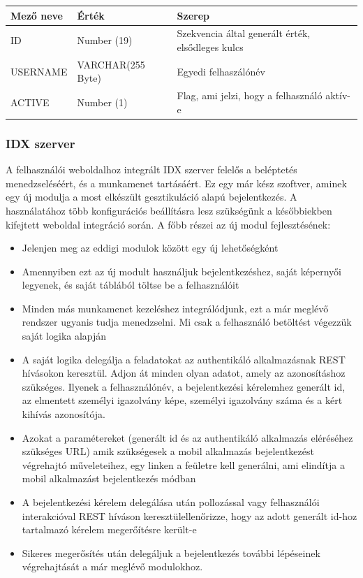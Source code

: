 	\begin{tabular}{|p{4cm}|p{3cm} |p{4cm}|}
   	\hline
	\textbf{Mező neve} & \textbf{Érték} & \textbf{Szerep}\\ \hline
	ID & Number (19) & Szekvencia által generált érték, elsődleges kulcs \\ \hline
	USERNAME & VARCHAR(255 Byte) & Egyedi felhaszálónév  \\ \hline
	ACTIVE & Number (1) & Flag, ami jelzi, hogy a felhasználó aktív-e \\ \hline
	\end{tabular}

\subsubsection{IDX szerver}
A felhasználói weboldalhoz integrált IDX szerver felelős a beléptetés menedzseléséért, és a munkamenet tartásáért. Ez egy már kész szoftver, aminek egy új modulja a most elkészült gesztikuláció alapú bejelentkezés. A használatához több konfigurációs beállításra lesz szükségünk a későbbiekben kifejtett weboldal integráció során. A főbb részei az új modul fejlesztésének: 
\begin{itemize}
\item Jelenjen meg az eddigi modulok között egy új lehetőségként
\item Amennyiben ezt az új modult használjuk bejelentkezéshez, saját képernyői legyenek, és saját táblából töltse be a felhasználóit
\item Minden más munkamenet kezeléshez integrálódjunk, ezt a már meglévő rendszer ugyanis tudja menedzselni. Mi csak a felhasználó betöltést végezzük saját logika alapján
\item A saját logika delegálja a feladatokat az authentikáló alkalmazásnak REST hívásokon keresztül. Adjon át minden olyan adatot, amely az azonosításhoz szükséges. Ilyenek a felhasználónév, a bejelentkezési kérelemhez generált id, az elmentett személyi igazolvány képe, személyi igazolvány száma és a kért kihívás azonosítója.
\item Azokat a paramétereket (generált id és az authentikáló alkalmazás eléréséhez szükséges URL) amik szükségesek a mobil alkalmazás bejelentkezést végrehajtó műveleteihez, egy linken a feületre kell generálni, ami elindítja a mobil alkalmazást bejelentkezés módban
\item A bejelentkezési kérelem delegálása után pollozással vagy felhasználói interakcióval REST híváson keresztülellenőrizze, hogy az adott generált id-hoz tartalmazó kérelem megerőítésre került-e
\item Sikeres megerősítés után delegáljuk a bejelentkezés további lépéseinek végrehajtását a már meglévő modulokhoz.
\end{itemize}

